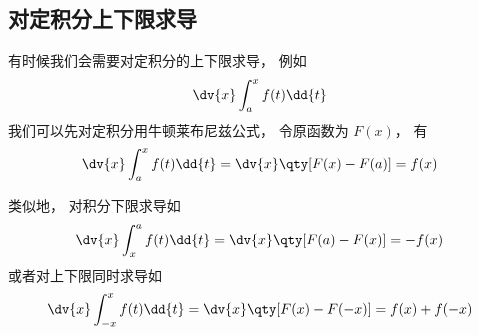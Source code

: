 \subsection{对定积分上下限求导}
有时候我们会需要对定积分的上下限求导， 例如
\begin{equation}
\dv{x} \int_a^x f(t) \dd{t}
\end{equation}
我们可以先对定积分用牛顿莱布尼兹公式， 令原函数为 $F(x)$， 有
\begin{equation}\label{NLeib_eq10}
\dv{x} \int_a^x f(t) \dd{t} = \dv{x} \qty[F(x) - F(a)] = f(x)
\end{equation}

类似地， 对积分下限求导如
\begin{equation}
\dv{x} \int_x^a f(t) \dd{t} = \dv{x} \qty[F(a) - F(x)] = -f(x)
\end{equation}
或者对上下限同时求导如
\begin{equation}
\dv{x} \int_{-x}^{x} f(t) \dd{t} = \dv{x} \qty[F(x) - F(-x)] = f(x) + f(-x)
\end{equation}


